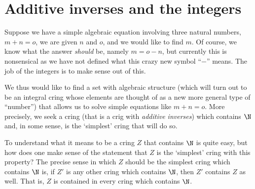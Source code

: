 \section{Additive inverses and the integers}

Suppose we have a simple algebraic equation involving three natural numbers, $m+n=o$, we are given $n$ and $o$, and we would like to find $m$.  Of course, we know what the answer \emph{should} be, namely $m=o-n$, but currently this is nonsensical as we have not defined what this crazy new symbol ``$-$'' means.  The job of the integers is to make sense out of this.

We thus would like to find a set with algebraic structure (which will turn out to be an integral cring whose elements are thought of as a new more general type of ``number'') that allows us to solve simple equations like $m+n=o$.  More precisely, we seek a cring (that is a crig with \emph{additive inverses}) which contains $\N$ and, in some sense, is the `simplest' cring that will do so.

To understand what it means to be a cring $Z$ that contains $\N$ is quite easy, but how does one make sense of the statement that $Z$ is the `simplest' cring with this property?  The precise sense in which $Z$ should be the simplest cring which contains $\N$ is, if $Z'$ is any other cring which contains $\N$, then $Z'$ contains $Z$ as well.  That is, $Z$ is contained in every cring which contains $\N$.

